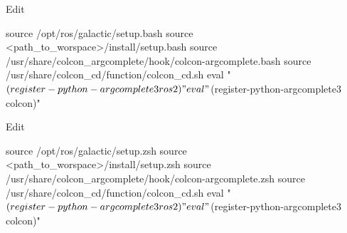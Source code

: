\documentclass[usenames,11,dvipsnames,svgnames,x11names,aspectratio=1610,bibref]{beamer}
\newcommand{\mydisclaimer}{{\color{disclaimer}{\footnotesize Lecture 1~}}}
\renewcommand\sec{{\cnordSix{\secname}\hfill\mydisclaimer} }
\begin{document}
\begin{frame}[fragile]{\sec}
\vspace*{\fill}
\begin{center} 


\begin{compactitem}
\footnotesize
\item Edit 
    \begin{bashScriptListLine}
source /opt/ros/galactic/setup.bash
source <path_to_worspace>/install/setup.bash 
source /usr/share/colcon_argcomplete/hook/colcon-argcomplete.bash
source /usr/share/colcon_cd/function/colcon_cd.sh
eval "$(register-python-argcomplete3 ros2)"
eval "$(register-python-argcomplete3 colcon)"
    \end{bashScriptListLine}

\item Edit 
    \begin{bashScriptListLine}
source /opt/ros/galactic/setup.zsh
source <path_to_worspace>/install/setup.zsh 
source /usr/share/colcon_argcomplete/hook/colcon-argcomplete.zsh
source /usr/share/colcon_cd/function/colcon_cd.sh
eval "$(register-python-argcomplete3 ros2)"
eval "$(register-python-argcomplete3 colcon)"
    \end{bashScriptListLine}
    
\end{compactitem}

\end{center}
\vspace*{\fill}
\end{frame}


\end{document}
